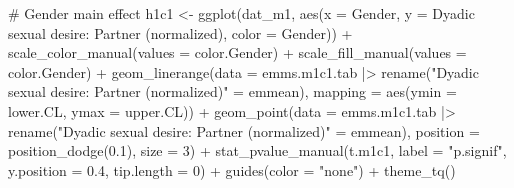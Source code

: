 \documentclass[
  bookmarksnumbered]{article}
\newenvironment{Shaded}{\begin{snugshade}}{\end{snugshade}}
\newcommand{\AttributeTok}[1]{\textcolor[rgb]{0.80,0.80,0.80}{#1}}
\newcommand{\CommentTok}[1]{\textcolor[rgb]{0.50,0.62,0.50}{#1}}
\newcommand{\DecValTok}[1]{\textcolor[rgb]{0.86,0.86,0.80}{#1}}
\newcommand{\FloatTok}[1]{\textcolor[rgb]{0.75,0.75,0.82}{#1}}
\newcommand{\FunctionTok}[1]{\textcolor[rgb]{0.94,0.94,0.56}{#1}}
\newcommand{\NormalTok}[1]{\textcolor[rgb]{0.80,0.80,0.80}{#1}}
\newcommand{\OtherTok}[1]{\textcolor[rgb]{0.94,0.94,0.56}{#1}}
\newcommand{\SpecialCharTok}[1]{\textcolor[rgb]{0.86,0.64,0.64}{#1}}
\newcommand{\StringTok}[1]{\textcolor[rgb]{0.80,0.58,0.58}{#1}}
\begin{document}
\begin{Shaded}
\begin{Highlighting}[]
\CommentTok{\# Gender main effect}
\NormalTok{h1c1 }\OtherTok{\textless{}{-}} \FunctionTok{ggplot}\NormalTok{(dat\_m1, }\FunctionTok{aes}\NormalTok{(}\AttributeTok{x =}\NormalTok{ Gender, }\AttributeTok{y =} \StringTok{\textasciigrave{}}\AttributeTok{Dyadic sexual desire: Partner (normalized)}\StringTok{\textasciigrave{}}\NormalTok{, }
                           \AttributeTok{color =}\NormalTok{ Gender)) }\SpecialCharTok{+}
  \FunctionTok{scale\_color\_manual}\NormalTok{(}\AttributeTok{values =}\NormalTok{ color.Gender) }\SpecialCharTok{+}
  \FunctionTok{scale\_fill\_manual}\NormalTok{(}\AttributeTok{values =}\NormalTok{ color.Gender) }\SpecialCharTok{+}
  \FunctionTok{geom\_linerange}\NormalTok{(}\AttributeTok{data =}\NormalTok{ emms.m1c1.tab }\SpecialCharTok{|\textgreater{}} 
                   \FunctionTok{rename}\NormalTok{(}\StringTok{"Dyadic sexual desire: Partner (normalized)"} \OtherTok{=}\NormalTok{ emmean),}
                 \AttributeTok{mapping =} \FunctionTok{aes}\NormalTok{(}\AttributeTok{ymin =}\NormalTok{ lower.CL, }\AttributeTok{ymax =}\NormalTok{ upper.CL)) }\SpecialCharTok{+}
  \FunctionTok{geom\_point}\NormalTok{(}\AttributeTok{data =}\NormalTok{ emms.m1c1.tab }\SpecialCharTok{|\textgreater{}} 
               \FunctionTok{rename}\NormalTok{(}\StringTok{"Dyadic sexual desire: Partner (normalized)"} \OtherTok{=}\NormalTok{ emmean), }
             \AttributeTok{position =} \FunctionTok{position\_dodge}\NormalTok{(}\FloatTok{0.1}\NormalTok{), }
             \AttributeTok{size =} \DecValTok{3}\NormalTok{) }\SpecialCharTok{+}
  \FunctionTok{stat\_pvalue\_manual}\NormalTok{(t.m1c1, }
                     \AttributeTok{label =} \StringTok{"p.signif"}\NormalTok{, }
                     \AttributeTok{y.position =} \FloatTok{0.4}\NormalTok{, }
                     \AttributeTok{tip.length =} \DecValTok{0}\NormalTok{) }\SpecialCharTok{+}
  \FunctionTok{guides}\NormalTok{(}\AttributeTok{color =} \StringTok{"none"}\NormalTok{) }\SpecialCharTok{+}
  \FunctionTok{theme\_tq}\NormalTok{()}


\end{Highlighting}
\end{Shaded}
\end{document}
